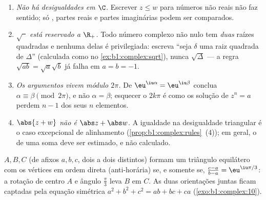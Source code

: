 \begin{remark}\label{rem:b1:complex:pitfalls}
\begin{enumerate}
  \item \emph{Não há desigualdades em $\C$.} Escrever $z \leq w$ para
        números não reais não faz sentido; só , partes reais
        e partes imaginárias podem ser comparados.
  \item \emph{$\sqrt{\phantom z}$ está reservado a $\R_+$.} Todo
        número complexo não nulo tem \emph{duas} raízes quadradas e
        nenhuma delas é privilegiada: escreva ``seja $\delta$ uma raiz
        quadrada de $\Delta$'' (calculada como no
        \cref{ex:b1:complex:sqrt}), nunca $\sqrt\Delta$ ---
        a regra $\sqrt{ab} = \sqrt a\sqrt b$ já falha em
        $a = b = -1$.
  \item \emph{Os argumentos vivem módulo $2\pi$.} De
        $\eu^{\iu\alpha} = \eu^{\iu\beta}$ conclua $\alpha
        \equiv \beta \pmod{2\pi}$, e não $\alpha = \beta$;
        esquecer o $2k\pi$ é como os  solução de $z^n = a$
        perdem $n - 1$ dos seus $n$ elementos.
  \item \emph{$\abs{z + w}$ não é $\abs z + \abs w$.} A igualdade
        na desigualdade triangular é o caso excepcional de
        alinhamento (\cref{prop:b1:complex:rules}~(4)); em geral, o
         de uma soma deve ser estimado, e não calculado.
\end{enumerate}
\end{remark}

\begin{example}\label{ex:b1:complex:equilateral}
$A, B, C$ (de afixos $a, b, c$, dois a dois distintos) formam um
triângulo equilátero com os vértices em ordem direta (anti-horária) se, e
somente se, $\frac{c - a}{b - a} = \eu^{\iu\pi/3}$: a rotação de
centro $A$ e ângulo $\frac\pi3$ leva $B$ em $C$. As duas orientações
juntas ficam captadas pela equação simétrica $a^2 + b^2 + c^2 = ab
+ bc + ca$ (\cref{exo:b1:complex:10}).
\end{example}


